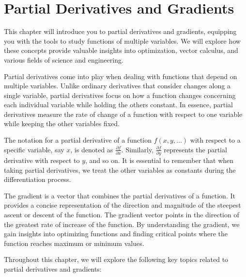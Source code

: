 \chapter{Partial Derivatives and Gradients}

This chapter will introduce you to partial derivatives and gradients, equipping you with the tools to study functions of multiple variables. We will explore how these concepts provide valuable insights into optimization, vector calculus, and various fields of science and engineering.

Partial derivatives come into play when dealing with functions that depend on multiple variables. Unlike ordinary derivatives that consider changes along a single variable, partial derivatives focus on how a function changes concerning each individual variable while holding the others constant. In essence, partial derivatives measure the rate of change of a function with respect to one variable while keeping the other variables fixed.

The notation for a partial derivative of a function $f(x, y, \ldots)$ with respect to a specific variable, say $x$, is denoted as $\frac{{\partial f}}{{\partial x}}$. Similarly, $\frac{{\partial f}}{{\partial y}}$ represents the partial derivative with respect to $y$, and so on. It is essential to remember that when taking partial derivatives, we treat the other variables as constants during the differentiation process.

The gradient is a vector that combines the partial derivatives of a function. It provides a concise representation of the direction and magnitude of the steepest ascent or descent of the function. The gradient vector points in the direction of the greatest rate of increase of the function. By understanding the gradient, we gain insights into optimizing functions and finding critical points where the function reaches maximum or minimum values.

Throughout this chapter, we will explore the following key topics related to partial derivatives and gradients:

